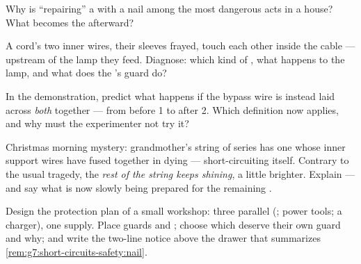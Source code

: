 \begin{exercise}[$\star$]\label{exo:g7:short-circuits-safety:8}
Why is ``repairing'' a  with a nail among the most dangerous
acts in a house? What becomes the  afterward?
\end{exercise}

\begin{exercise}[$\star\star$]\label{exo:g7:short-circuits-safety:9}
A cord's two inner wires, their sleeves frayed, touch each other
inside the cable --- upstream of the lamp they feed. Diagnose:
which kind of , what happens to the lamp, and what
does the 's guard do?
\end{exercise}

\begin{exercise}[$\star\star$]\label{exo:g7:short-circuits-safety:10}
In the  demonstration, predict what happens if the
bypass wire is instead laid across \emph{both}  together
--- from before  1 to after  2. Which definition now
applies, and why must the experimenter not try it?
\end{exercise}

\begin{exercise}[$\star\star$]\label{exo:g7:short-circuits-safety:11}
Christmas morning mystery: grandmother's string of series
 has one  whose inner support wires have fused
together in dying --- short-circuiting itself. Contrary to the
usual tragedy, the \emph{rest of the string keeps shining}, a
little brighter. Explain --- and say what is now slowly being
prepared for the remaining .
\end{exercise}

\begin{exercise}[$\star\star\star$]\label{exo:g7:short-circuits-safety:12}
Design the protection plan of a small workshop: three parallel
 (; power tools; a  charger), one supply.
Place guards and ; choose which  deserve their
own guard and why; and write the two-line notice above the 
drawer that summarizes
\cref{rem:g7:short-circuits-safety:nail}.
\end{exercise}

